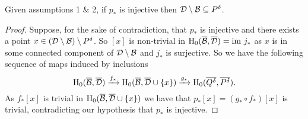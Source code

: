 \begin{lemma}\label{lem:coverage}
    Given assumptions 1 \& 2, if $p_*$ is injective then ${\mathcal{D}}\setminus{\mathcal{B}}\subseteq P^\delta$.
\end{lemma}
\begin{proof}
    Suppose, for the sake of contradiction, that $p_*$ is injective and there exists a point $x\in ({\mathcal{D}}\setminus{\mathcal{B}})\setminus P^\delta$.
    So $[x]$ is non-trivial in $\mathrm{H}_0(\overline{{\mathcal{B}}},\overline{{\mathcal{D}}}) = \mathrm{im}~j_*$ as $x$ is in some connected component of ${\mathcal{D}}\setminus{\mathcal{B}}$ and $j_*$ is surjective.
    So we have the following sequence of maps induced by inclusions
    \[ \mathrm{H}_0(\overline{{\mathcal{B}}},\overline{{\mathcal{D}}})\xrightarrow{f_*} \mathrm{H}_0(\overline{{\mathcal{B}}},\overline{{\mathcal{D}}}\cup\{x\})\xrightarrow{g_*} \mathrm{H}_0(\overline{Q^\delta},\overline{P^\delta}).\]
    As $f_*[x]$ is trivial in $\mathrm{H}_0(\overline{{\mathcal{B}}},\overline{{\mathcal{D}}}\cup\{x\})$ we have that $p_*[x] = (g_*\circ f_*)[x]$ is trivial, contradicting our hypothesis that $p_*$ is injective.
\end{proof}

